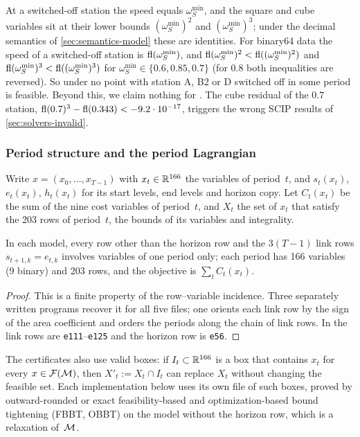 At a switched-off station the speed equals $\omega^{\min}_S$, and the square and cube variables sit at their lower bounds $(\omega^{\min}_S)^2$ and $(\omega^{\min}_S)^3$; under the decimal semantics of \cref{sec:semantics-model} these are identities.
For binary64 data the speed of a switched-off station is $\operatorname{fl}(\omega^{\min}_S)$, and $\operatorname{fl}(\omega^{\min}_S)^2<\operatorname{fl}((\omega^{\min}_S)^2)$ and $\operatorname{fl}(\omega^{\min}_S)^3<\operatorname{fl}((\omega^{\min}_S)^3)$ for $\omega^{\min}_S\in\{0.6,0.85,0.7\}$ (for $0.8$ both inequalities are reversed).
So under  no point with station A, B2 or D switched off in some period is feasible.
Beyond this, we claim nothing for .
The cube residual of the $0.7$ station, $\operatorname{fl}(0.7)^3-\operatorname{fl}(0.343)<-9.2\cdot10^{-17}$, triggers the wrong SCIP results of \cref{sec:solvers-invalid}.

\subsubsection{Period structure and the period Lagrangian}\label{app:waterno2-lagrangian}

Write $x=(x_0,\dots,x_{T-1})$ with $x_t\in\mathbb{R}^{166}$ the variables of period~$t$, and $s_t(x_t)$, $e_t(x_t)$, $h_t(x_t)$ for its start levels, end levels and horizon copy.
Let $C_t(x_t)$ be the sum of the nine cost variables of period~$t$, and $X_t$ the set of $x_t$ that satisfy the 203 rows of period~$t$, the bounds of its variables and integrality.

\begin{lemma}\label{lem:waterno2-structure}
In each model, every row other than the horizon row and the $3(T-1)$ link rows $s_{t+1,k}=e_{t,k}$ involves variables of one period only; each period has 166 variables (9 binary) and 203 rows, and the objective is $\sum_tC_t(x_t)$.
\end{lemma}

\begin{proof}
This is a finite property of the row--variable incidence.
Three separately written programs recover it for all five files; one orients each link row by the sign of the area coefficient and orders the periods along the chain of link rows.
In  the link rows are \texttt{e111}--\texttt{e125} and the horizon row is \texttt{e56}.
\end{proof}

The certificates also use valid boxes: if $I_t\subset\mathbb{R}^{166}$ is a box that contains $x_t$ for every $x\in\mathcal{F}(\mathcal{M})$, then $X'_t:=X_t\cap I_t$ can replace $X_t$ without changing the feasible set.
Each implementation below uses its own file of such boxes, proved by outward-rounded or exact feasibility-based and optimization-based bound tightening (FBBT, OBBT) on the model without the horizon row, which is a relaxation of~$\mathcal{M}$.

